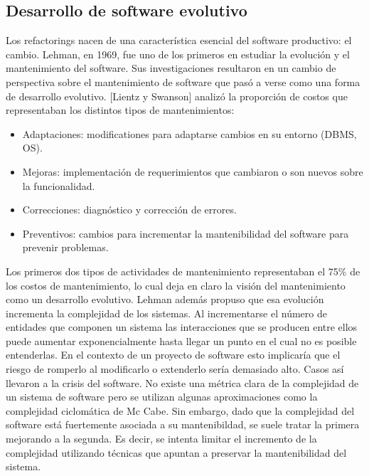 \subsection{Desarrollo de software evolutivo}
Los refactorings nacen de una característica esencial del software productivo: el cambio.
Lehman, en 1969, fue uno de los primeros en estudiar la evolución y el mantenimiento del software. Sus 
investigaciones resultaron en un cambio de perspectiva sobre el mantenimiento de software que pasó 
a verse como una forma de desarrollo evolutivo. 
[Lientz y Swanson] analizó la proporción de costos que representaban los distintos tipos de mantenimientos:

\begin{itemize}
    \item Adaptaciones: modificationes para adaptarse cambios en su entorno (DBMS, OS).
    \item Mejoras: implementación de requerimientos que cambiaron o son nuevos sobre la funcionalidad.
    \item Correcciones: diagnóstico y corrección de errores.
    \item Preventivos: cambios para incrementar la mantenibilidad del software para prevenir problemas.
\end{itemize}

Los primeros dos tipos de actividades de mantenimiento representaban el 75\% de los costos de mantenimiento,
lo cual deja en claro la visión del mantenimiento como un desarrollo evolutivo. Lehman además propuso
que esa evolución incrementa la complejidad de los sistemas. Al incrementarse el número de entidades
que componen un sistema las interacciones que se producen entre ellos puede aumentar exponencialmente
hasta llegar un punto en el cual no es posible entenderlas. En el contexto de un proyecto de software
esto implicaría que el riesgo de romperlo al modificarlo o extenderlo sería demasiado alto. Casos así
llevaron a la crisis del software.
No existe una métrica clara de la complejidad de un sistema de software pero se utilizan algunas aproximaciones
como la complejidad ciclomática de Mc Cabe. Sin embargo, dado que la complejidad del software está fuertemente
asociada a su mantenibildad, se suele tratar la primera mejorando a la segunda. Es decir, se intenta
limitar el incremento de la complejidad utilizando técnicas que apuntan a preservar la mantenibilidad
del sistema.


